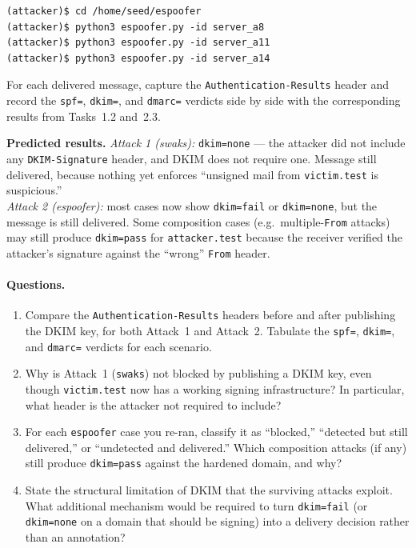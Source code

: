 \documentclass[11pt]{article}
\begin{document}
\begin{listing}[H]
\begin{verbatim}
(attacker)$ cd /home/seed/espoofer
(attacker)$ python3 espoofer.py -id server_a8
(attacker)$ python3 espoofer.py -id server_a11
(attacker)$ python3 espoofer.py -id server_a14
\end{verbatim}
\end{listing}

For each delivered message, capture the \texttt{Authentication-Results}
header and record the \texttt{spf=}, \texttt{dkim=}, and \texttt{dmarc=}
verdicts side by side with the corresponding results from Tasks~1.2
and~2.3.

\begin{infobox}
\textbf{Predicted results.}
\textit{Attack 1 (swaks):} \texttt{dkim=none} --- the attacker did not
include any \texttt{DKIM-Signature} header, and DKIM does not require
one. Message still delivered, because nothing yet enforces
``unsigned mail from \texttt{victim.test} is suspicious.''
\\[2pt]
\textit{Attack 2 (espoofer):} most cases now show
\texttt{dkim=fail} or \texttt{dkim=none}, but the message is still
delivered. Some composition cases (e.g.\ multiple-\texttt{From}
attacks) may still produce \texttt{dkim=pass} for \texttt{attacker.test}
because the receiver verified the attacker's signature against the
``wrong'' \texttt{From} header.
\end{infobox}

\paragraph{Questions.}
\begin{enumerate}[noitemsep]
  \item Compare the \texttt{Authentication-Results} headers before and
        after publishing the DKIM key, for both Attack~1 and Attack~2.
        Tabulate the \texttt{spf=}, \texttt{dkim=}, and \texttt{dmarc=}
        verdicts for each scenario.
  \item Why is Attack~1 (\texttt{swaks}) not blocked by publishing a
        DKIM key, even though \texttt{victim.test} now has a working
        signing infrastructure? In particular, what header is the
        attacker not required to include?
  \item For each \texttt{espoofer} case you re-ran, classify it as
        ``blocked,'' ``detected but still delivered,'' or ``undetected
        and delivered.'' Which composition attacks (if any) still
        produce \texttt{dkim=pass} against the hardened domain, and
        why?
  \item State the structural limitation of DKIM that the surviving
        attacks exploit. What additional mechanism would be required
        to turn \texttt{dkim=fail} (or \texttt{dkim=none} on a domain
        that should be signing) into a delivery decision rather than an
        annotation?
\end{enumerate}
\end{document}
